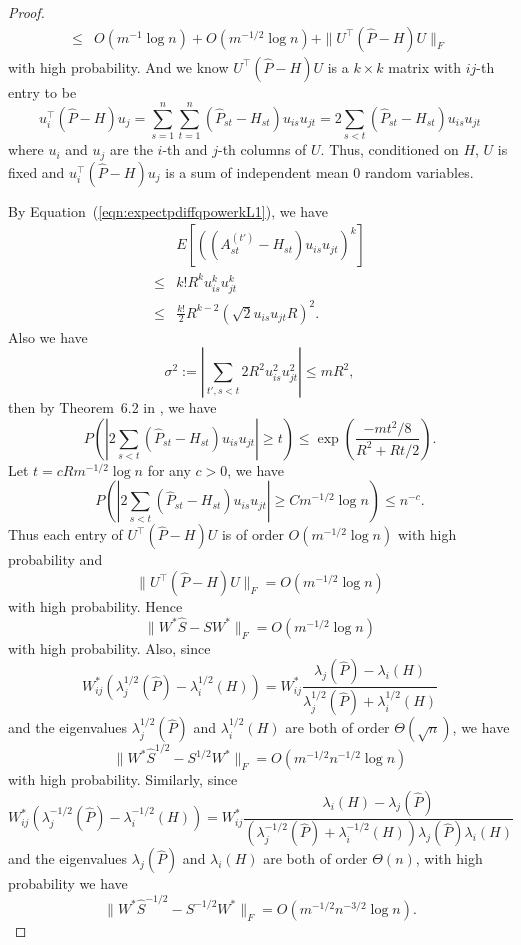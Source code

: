 \begin{proof}
\begin{align*}
    \le & O(m^{-1} \log n) + O(m^{-1/2} \log n) + \| U^{\top} (\hat{P} - H) U \|_F
\end{align*}
with high probability. And we know $U^{\top} (\hat{P} - H) U$ is a $k \times k$ matrix with $ij$-th entry to be
\[
	u_i^{\top} (\hat{P} - H) u_j
    = \sum_{s=1}^n \sum_{t=1}^n (\hat{P}_{st} - H_{st}) u_{is} u_{jt}
    = 2 \sum_{s<t} (\hat{P}_{st} - H_{st}) u_{is} u_{jt}
\]
where $u_i$ and $u_j$ are the $i$-th and $j$-th columns of $U$. Thus, conditioned on $H$, $U$ is fixed and $u_i^{\top} (\hat{P} - H) u_j$ is a sum of independent mean 0 random variables.


By Equation~(\ref{eqn:expectpdiffqpowerkL1}), we have
\begin{align*}
	& E\left[\left((A^{(t')}_{st} - H_{st}) u_{is} u_{jt}\right)^k\right] \\
    \le & k! R^k u_{is}^k u_{jt}^k \\
    \le & \frac{k!}{2} R^{k-2} (\sqrt{2} u_{is} u_{jt} R)^2.
\end{align*}
Also we have
\[
	\sigma^2 := \left|\sum_{t', s<t} 2 R^2 u_{is}^2 u_{jt}^2\right| \le m R^2,
\]
then by Theorem~6.2 in \citep{tropp2012user}, we have
\[
	P \left( \left| 2 \sum_{s<t} (\hat{P}_{st} - H_{st}) u_{is} u_{jt} \right| \ge t \right)
    \le \exp \left( \frac{-m t^2/8}{R^2 + R t /2} \right).
\]
Let $t = c R m^{-1/2} \log n$ for any $c > 0$, we have
\[
P \left( \left| 2 \sum_{s<t} (\hat{P}_{st} - H_{st}) u_{is} u_{jt} \right| \ge C m^{-1/2} \log n \right)
    \le n^{-c}.
\]
Thus each entry of $U^{\top}(\hat{P} - H)U$ is of order $O(m^{-1/2} \log n)$ with high probability and
\begin{equation}
\label{eqn:uPhatdiffHuL1}
	\|U^{\top}(\hat{P} - H)U\|_F = O(m^{-1/2} \log n)
\end{equation}
with high probability.
Hence
\[
	\| W^* \hat{S} - S W^* \|_F = O(m^{-1/2} \log n)
\]
with high probability.
Also, since
\[
	W_{ij}^* (\lambda_j^{1/2}(\hat{P}) - \lambda_i^{1/2}(H)) = W_{ij}^* \frac{\lambda_j(\hat{P}) - \lambda_i(H)}{\lambda_j^{1/2}(\hat{P}) + \lambda_i^{1/2}(H)}
\]
and the eigenvalues $\lambda_j^{1/2}(\hat{P})$ and $\lambda_i^{1/2}(H)$ are both of order $\Theta(\sqrt{n})$, we have
\[
	\| W^* \hat{S}^{1/2} - S^{1/2} W^* \|_F = O(m^{-1/2} n^{-1/2} \log n)
\]
with high probability.
Similarly, since
\[
	W_{ij}^* (\lambda_j^{-1/2}(\hat{P}) - \lambda_i^{-1/2}(H)) = W_{ij}^* \frac{\lambda_i(H) - \lambda_j(\hat{P})}{(\lambda_j^{-1/2}(\hat{P}) + \lambda_i^{-1/2}(H))\lambda_j(\hat{P}) \lambda_i(H)}
\]
and the eigenvalues $\lambda_j(\hat{P})$ and $\lambda_i(H)$ are both of order $\Theta(n)$, with high probability we have
\[
	\| W^* \hat{S}^{-1/2} - S^{-1/2} W^* \|_F = O(m^{-1/2} n^{-3/2} \log n).
\]
\end{proof}

